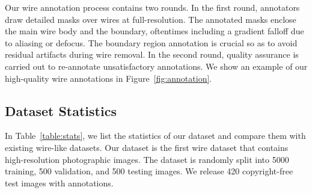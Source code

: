 

Our wire annotation process contains two rounds. In the first round, annotators draw detailed masks over wires at full-resolution. The annotated masks enclose the main wire body and the boundary, oftentimes including a gradient falloff due to aliasing or defocus.
The boundary region annotation is crucial so as to avoid residual artifacts during wire removal.
In the second round, quality assurance is carried out to re-annotate unsatisfactory annotations. We show an example of our high-quality wire annotations in Figure~\ref{fig:annotation}. 

\subsection{Dataset Statistics}

In Table~\ref{table:stats}, we list the statistics of our dataset and compare them with existing wire-like datasets. Our dataset is the first wire dataset that contains high-resolution photographic images. The dataset is randomly split into 5000 training, 500 validation, and 500 testing images. We release 420 copyright-free test images with annotations.




